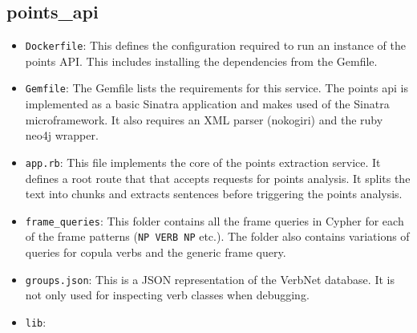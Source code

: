 \subsection*{points\_api}
  \begin{itemize}
    \item
      \texttt{Dockerfile}: This defines the configuration required to run an instance of the points API. This includes installing the dependencies from the Gemfile.
    \item
      \texttt{Gemfile}: The Gemfile lists the requirements for this service. The points api is implemented as a basic Sinatra application and makes used of the Sinatra microframework. It also requires an XML parser (nokogiri) and the ruby neo4j wrapper.
    \item
      \texttt{app.rb}: This file implements the core of the points extraction service. It defines a root route that that accepts requests for points analysis. It splits the text into chunks and extracts sentences before triggering the points analysis.
    \item
      \texttt{frame\_queries}: This folder contains all the frame queries in Cypher for each of the frame patterns (\texttt{NP VERB NP} etc.). The folder also contains variations of queries for copula verbs and the generic frame query.
    \item
      \texttt{groups.json}: This is a JSON representation of the VerbNet database. It is not only used for inspecting verb classes when debugging.
    \item
      \texttt{lib}:


\end{itemize}
